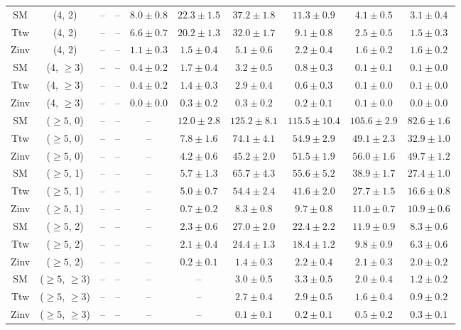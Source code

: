 \begin{table}[h!]
{\begin{tabular}{cccccccccc}
	SM & (4, 2) & -- & -- & $8.0\pm 0.8$ & $22.3\pm 1.5$ & $37.2\pm 1.8$ & $11.3\pm 0.9$ & $4.1\pm 0.5$ & $3.1\pm 0.4$ \\[0.5ex] 
	Ttw & (4, 2) & -- & -- & $6.6\pm 0.7$ & $20.2\pm 1.3$ & $32.0\pm 1.7$ & $9.1\pm 0.8$ & $2.5\pm 0.5$ & $1.5\pm 0.3$ \\[0.5ex] 
	Zinv & (4, 2) & -- & -- & $1.1\pm 0.3$ & $1.5\pm 0.4$ & $5.1\pm 0.6$ & $2.2\pm 0.4$ & $1.6\pm 0.2$ & $1.6\pm 0.2$ \\[0.5ex] 
	SM & (4, $\ge3$) & -- & -- & $0.4\pm 0.2$ & $1.7\pm 0.4$ & $3.2\pm 0.5$ & $0.8\pm 0.3$ & $0.1\pm 0.1$ & $0.1\pm 0.0$ \\[0.5ex] 
	Ttw & (4, $\ge3$) & -- & -- & $0.4\pm 0.2$ & $1.4\pm 0.3$ & $2.9\pm 0.4$ & $0.6\pm 0.3$ & $0.1\pm 0.0$ & $0.1\pm 0.0$ \\[0.5ex] 
	Zinv & (4, $\ge3$) & -- & -- & $0.0\pm 0.0$ & $0.3\pm 0.2$ & $0.3\pm 0.2$ & $0.2\pm 0.1$ & $0.1\pm 0.0$ & $0.0\pm 0.0$ \\[0.5ex] 
	SM & ($\ge5$, 0) & -- & -- & -- & $12.0\pm 2.8$ & $125.2\pm 8.1$ & $115.5\pm 10.4$ & $105.6\pm 2.9$ & $82.6\pm 1.6$ \\[0.5ex] 
	Ttw & ($\ge5$, 0) & -- & -- & -- & $7.8\pm 1.6$ & $74.1\pm 4.1$ & $54.9\pm 2.9$ & $49.1\pm 2.3$ & $32.9\pm 1.0$ \\[0.5ex] 
	Zinv & ($\ge5$, 0) & -- & -- & -- & $4.2\pm 0.6$ & $45.2\pm 2.0$ & $51.5\pm 1.9$ & $56.0\pm 1.6$ & $49.7\pm 1.2$ \\[0.5ex] 
	SM & ($\ge5$, 1) & -- & -- & -- & $5.7\pm 1.3$ & $65.7\pm 4.3$ & $55.6\pm 5.2$ & $38.9\pm 1.7$ & $27.4\pm 1.0$ \\[0.5ex] 
	Ttw & ($\ge5$, 1) & -- & -- & -- & $5.0\pm 0.7$ & $54.4\pm 2.4$ & $41.6\pm 2.0$ & $27.7\pm 1.5$ & $16.6\pm 0.8$ \\[0.5ex] 
	Zinv & ($\ge5$, 1) & -- & -- & -- & $0.7\pm 0.2$ & $8.3\pm 0.8$ & $9.7\pm 0.8$ & $11.0\pm 0.7$ & $10.9\pm 0.6$ \\[0.5ex] 
	SM & ($\ge5$, 2) & -- & -- & -- & $2.3\pm 0.6$ & $27.0\pm 2.0$ & $22.4\pm 2.2$ & $11.9\pm 0.9$ & $8.3\pm 0.6$ \\[0.5ex] 
	Ttw & ($\ge5$, 2) & -- & -- & -- & $2.1\pm 0.4$ & $24.4\pm 1.3$ & $18.4\pm 1.2$ & $9.8\pm 0.9$ & $6.3\pm 0.6$ \\[0.5ex] 
	Zinv & ($\ge5$, 2) & -- & -- & -- & $0.2\pm 0.1$ & $1.4\pm 0.3$ & $2.2\pm 0.4$ & $2.1\pm 0.3$ & $2.0\pm 0.2$ \\[0.5ex] 
	SM & ($\ge5$, $\ge3$) & -- & -- & -- & -- & $3.0\pm 0.5$ & $3.3\pm 0.5$ & $2.0\pm 0.4$ & $1.2\pm 0.2$ \\[0.5ex] 
	Ttw & ($\ge5$, $\ge3$) & -- & -- & -- & -- & $2.7\pm 0.4$ & $2.9\pm 0.5$ & $1.6\pm 0.4$ & $0.9\pm 0.2$ \\[0.5ex] 
	Zinv & ($\ge5$, $\ge3$) & -- & -- & -- & -- & $0.1\pm 0.1$ & $0.2\pm 0.1$ & $0.5\pm 0.2$ & $0.3\pm 0.1$ \\[0.5ex] 
	\hline
	\hline
\end{tabular}}
\end{table}
